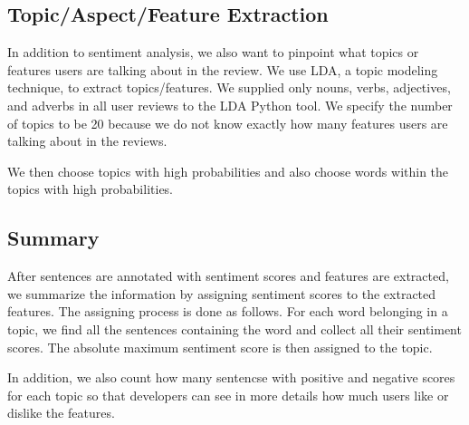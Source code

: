 \subsection{Topic/Aspect/Feature Extraction}
In addition to sentiment analysis, we also want to pinpoint what topics or features users are talking about in the review. We use LDA, a topic modeling technique, to extract topics/features. We supplied only nouns, verbs, adjectives, and adverbs in all user reviews to the LDA Python tool. We specify the number of topics to be 20 because we do not know exactly how many features users are talking about in the reviews.

We then choose topics with high probabilities and also choose words within the topics with high probabilities.

\subsection{Summary}
\label{Summary}
After sentences are annotated with sentiment scores and features are extracted, we summarize the information by assigning sentiment scores to the extracted features. The assigning process is done as follows. For each word belonging in a topic, we find all the sentences containing the word and collect all their sentiment scores. The absolute maximum sentiment score is then assigned to the topic.

In addition, we also count how many sentencse with positive and negative scores for each topic so that developers can see in more details how much users like or dislike the features. 


